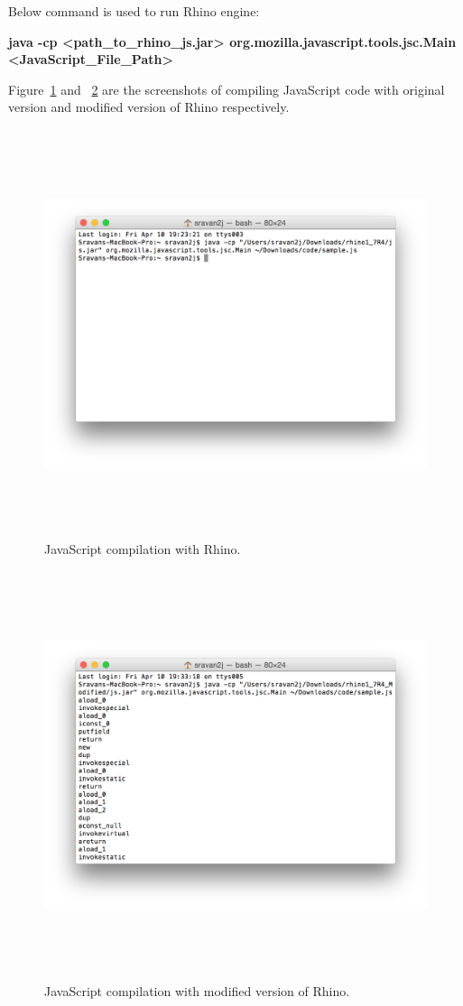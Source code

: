Below command is used to run Rhino engine:
 
\textbf{java -cp <path\_to\_rhino\_js.jar> org.mozilla.javascript.tools.jsc.Main <JavaScript\_File\_Path>}
 
Figure~\ref{fig:codecomprhino} and ~\ref{fig:codecompmodifiedrhino} are the screenshots of compiling JavaScript code with original version and modified version of Rhino respectively. 

\begin{figure}
  \centering
      \includegraphics[width=17cm, height=11.95cm]{rhino_screenshot1.png}
    \caption[JavaScript compilation with Rhino]{JavaScript compilation with Rhino.}
    \label{fig:codecomprhino}
\end{figure}

\begin{figure}
  \centering
      \includegraphics[width=17cm, height=11.95cm]{rhino_screenshot2.png}
    \caption[JavaScript compilation with modified version of Rhino]{JavaScript compilation with modified version of Rhino.}
    \label{fig:codecompmodifiedrhino}
\end{figure}